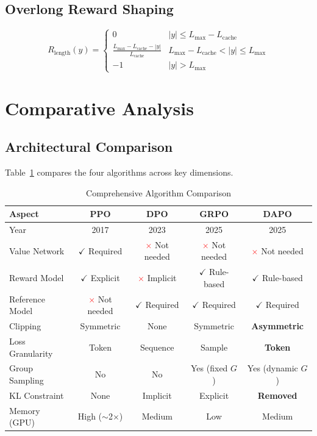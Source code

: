 \documentclass[10pt,twocolumn]{article}
\newcommand{\cmark}{\textcolor{green!60!black}{$\checkmark$}}
\newcommand{\xmark}{\textcolor{red}{$\times$}}
\begin{document}
\subsection{Overlong Reward Shaping}

\begin{equation}
R_{\text{length}}(y) = \begin{cases}
0 & |y| \leq L_{\max} - L_{\text{cache}} \\
\frac{L_{\max} - L_{\text{cache}} - |y|}{L_{\text{cache}}} & L_{\max} - L_{\text{cache}} < |y| \leq L_{\max} \\
-1 & |y| > L_{\max}
\end{cases}
\label{eq:overlong}
\end{equation}

\section{Comparative Analysis}
\label{sec:compare}

\subsection{Architectural Comparison}

Table~\ref{tab:arch} compares the four algorithms across key dimensions.

\begin{table}[ht]
\centering
\caption{Comprehensive Algorithm Comparison}
\label{tab:arch}
\begin{tabular}{lcccc}
\toprule
\textbf{Aspect} & \textbf{PPO} & \textbf{DPO} & \textbf{GRPO} & \textbf{DAPO} \\
\midrule
Year & 2017 & 2023 & 2025 & 2025 \\
Value Network & \cmark{} Required & \xmark{} Not needed & \xmark{} Not needed & \xmark{} Not needed \\
Reward Model & \cmark{} Explicit & \xmark{} Implicit & \cmark{} Rule-based & \cmark{} Rule-based \\
Reference Model & \xmark{} Not needed & \cmark{} Required & \cmark{} Required & \cmark{} Required \\
Clipping & Symmetric & None & Symmetric & \textbf{Asymmetric} \\
Loss Granularity & Token & Sequence & Sample & \textbf{Token} \\
Group Sampling & No & No & Yes (fixed $G$) & Yes (dynamic $G$) \\
KL Constraint & None & Implicit & Explicit & \textbf{Removed} \\
Memory (GPU) & High ($\sim$2$\times$) & Medium & Low & Medium \\
\bottomrule
\end{tabular}
\end{table}
\end{document}
